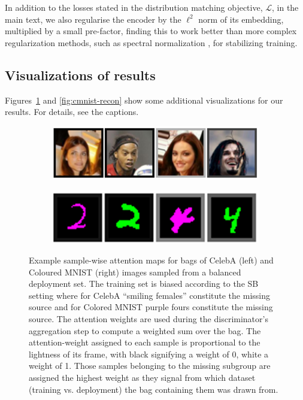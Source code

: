 In addition to the losses stated in the distribution matching objective, $\mathcal{L}$, in the main text, we also regularise the encoder by the $\ell^2$ norm of its embedding, multiplied by a small pre-factor, finding this to work better than more complex regularization methods, such as spectral normalization \citep{miyato2018spectral}, for stabilizing training.

\subsection{Visualizations of results}\label{sec:qual-results}
Figures~\ref{fig:attn_maps} and \ref{fig:cmnist-recon} show some additional visualizations for our results.
For details, see the captions.
\begin{figure}[tb]
  \centering
    \begin{subfigure}[b]{0.49\textwidth}
    \includegraphics[width=\textwidth]{figures/celeba_attn_map.png}
    \end{subfigure}
    \hfill
    \begin{subfigure}[b]{0.49\textwidth}
    \includegraphics[width=\textwidth]{figures/cmnist_attn_map.png}
    \end{subfigure}
  \caption{
    Example sample-wise attention maps for bags of CelebA (left) and Coloured MNIST (right) images sampled from a balanced deployment set. The training set is biased according to the SB setting where for CelebA ``smiling females'' constitute the missing source and for Colored MNIST {\color{purple}purple} fours constitute the missing source. The attention weights are used during the discriminator's aggregation step to compute a weighted sum over the bag. The attention-weight assigned to each sample is proportional to the lightness of its frame, with black signifying a weight of 0, white a weight of 1. Those samples belonging to the missing subgroup are assigned the highest weight as they signal from which dataset (training vs. deployment) the bag containing them was drawn from.
  }%
  \label{fig:attn_maps}
\end{figure}

